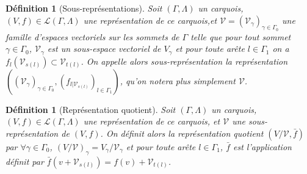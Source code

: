 \documentclass[a4paper,11pt]{article}
\newtheorem{defi}[thm]{Définition}%
\begin{document}
\begin{defi}[Sous-représentations]
	Soit $(\Gamma,\Lambda)$ un carquois, $(V,f)\in\mathscr L(\Gamma,\Lambda)$ une représentation de ce carquois,et $\mathscr V=(\mathscr V_{\gamma})_{\gamma\in\Gamma_0}$ une famille d'espaces vectoriels sur les sommets de $\Gamma$ telle que pour tout sommet $\gamma\in\Gamma_0$, $\mathscr V_\gamma$ est un sous-espace vectoriel de $V_\gamma$ et pour toute arête $l\in\Gamma_1$ on a $f_l(\mathscr V_{s(l)})\subset\mathscr V_{t(l)}$. On appelle alors \emph{sous-représentation} la représentation $((\mathscr V_\gamma)_{\gamma\in\Gamma_0}, (f_{l|\mathscr V_{s(l)}})_{l\in\Gamma_1})$, qu'on notera plus simplement $\mathscr V$.
\end{defi}
\begin{defi}[Représentation quotient]
	Soit $(\Gamma,\Lambda)$ un carquois, $(V,f)\in\mathscr L(\Gamma,\Lambda)$ une représentation de ce carquois, et $\mathscr V$ une sous-représentation de $(V,f)$. On définit alors la \emph{représentation quotient} $(V/\mathscr V,\bar f)$ par $\forall\gamma\in\Gamma_0$, $(V/\mathscr V)_\gamma=V_\gamma/\mathscr V_\gamma$ et pour toute arête $l\in\Gamma_1$, $\bar f$ est l'application définit par $\bar f(v+\mathscr V_{s(l)})=f(v)+\mathscr V_{t(l)}$.
\end{defi}
\end{document}

